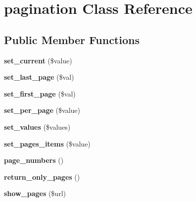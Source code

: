 \hypertarget{classpagination}{
\section{\-p\-a\-g\-i\-n\-a\-t\-i\-o\-n \-C\-l\-a\-s\-s \-R\-e\-f\-e\-r\-e\-n\-c\-e}
\label{classpagination}
}
\subsection*{Public Member Functions}
\begin{DoxyCompactItemize}
\item 
\hypertarget{classpagination_af9f24baee8d823f6a5efff99ff85d390}{
{\bfseries \-s\-e\-t\_\-\-c\-u\-r\-r\-e\-n\-t} \-(\$\-v\-a\-l\-u\-e\-)}
\label{classpagination_af9f24baee8d823f6a5efff99ff85d390}

\item 
\hypertarget{classpagination_a3ce51e7f8f12a5688720b6828454b2fc}{
{\bfseries \-s\-e\-t\_\-\-l\-a\-s\-t\_\-\-p\-a\-g\-e} \-(\$\-v\-a\-l\-)}
\label{classpagination_a3ce51e7f8f12a5688720b6828454b2fc}

\item 
\hypertarget{classpagination_ad8336d286ee50abdb15974495cf466a6}{
{\bfseries \-s\-e\-t\_\-\-f\-i\-r\-s\-t\_\-\-p\-a\-g\-e} \-(\$\-v\-a\-l\-)}
\label{classpagination_ad8336d286ee50abdb15974495cf466a6}

\item 
\hypertarget{classpagination_a92946cd79eeba6e4f829addda7925607}{
{\bfseries \-s\-e\-t\_\-\-p\-e\-r\_\-\-p\-a\-g\-e} \-(\$\-v\-a\-l\-u\-e\-)}
\label{classpagination_a92946cd79eeba6e4f829addda7925607}

\item 
\hypertarget{classpagination_a6d386f3c54b7a872fff9243cdf5af6c0}{
{\bfseries \-s\-e\-t\_\-\-v\-a\-l\-u\-e\-s} \-(\$\-v\-a\-l\-u\-e\-s\-)}
\label{classpagination_a6d386f3c54b7a872fff9243cdf5af6c0}

\item 
\hypertarget{classpagination_a910530a4fe108c830cd9e1f786cffe22}{
{\bfseries \-s\-e\-t\_\-\-p\-a\-g\-e\-s\_\-\-i\-t\-e\-m\-s} \-(\$\-v\-a\-l\-u\-e\-)}
\label{classpagination_a910530a4fe108c830cd9e1f786cffe22}

\item 
\hypertarget{classpagination_a17fc3dc9985a3239f744666a83dbf65f}{
{\bfseries \-p\-a\-g\-e\_\-\-n\-u\-m\-b\-e\-r\-s} \-(\-)}
\label{classpagination_a17fc3dc9985a3239f744666a83dbf65f}

\item 
\hypertarget{classpagination_a1183022d9352a8799e170eb2810783d2}{
{\bfseries \-r\-e\-t\-u\-r\-n\_\-\-o\-n\-l\-y\_\-\-p\-a\-g\-e\-s} \-(\-)}
\label{classpagination_a1183022d9352a8799e170eb2810783d2}

\item 
\hypertarget{classpagination_a44afe70dd75bf71433d18c436852d1cf}{
{\bfseries \-s\-h\-o\-w\_\-\-p\-a\-g\-e\-s} \-(\$\-u\-r\-l\-)}
\label{classpagination_a44afe70dd75bf71433d18c436852d1cf}

\end{DoxyCompactItemize}
